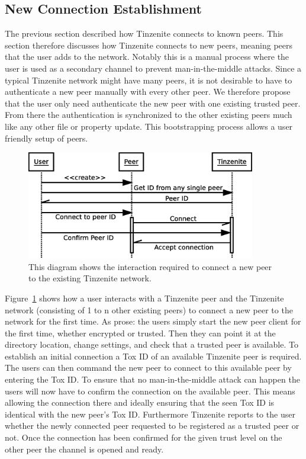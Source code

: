 \subsection{New Connection Establishment}
\label{sub:New Connection Establishment}

The previous section described how Tinzenite connects to known peers.
This section therefore discusses how Tinzenite connects to new peers, meaning peers that the user adds to the network.
Notably this is a manual process where the user is used as a secondary channel to prevent man-in-the-middle attacks.
Since a typical Tinzenite network might have many peers, it is not desirable to have to authenticate a new peer manually with every other peer.
We therefore propose that the user only need authenticate the new peer with one existing trusted peer.
From there the authentication is synchronized to the other existing peers much like any other file or property update.
This bootstrapping process allows a user friendly setup of peers.

\begin{figure}[htp]
\centering
    \includegraphics[width=10cm]{diagram/sequence_new_connect}
\caption[New Connection Sequence Diagram]{This diagram shows the interaction required to connect a new peer to the existing Tinzenite network.}
\label{diagram:new_connection}
\end{figure}

Figure~\ref{diagram:new_connection} shows how a user interacts with a Tinzenite peer and the Tinzenite network (consisting of 1 to n other existing peers) to connect a new peer to the network for the first time.
As prose: the users simply start the new peer client for the first time, whether encrypted or trusted.
Then they can point it at the directory location, change settings, and check that a trusted peer is available.
To establish an initial connection a Tox ID of an available Tinzenite peer is required.
The users can then command the new peer to connect to this available peer by entering the Tox ID.
To ensure that no man-in-the-middle attack can happen the users will now have to confirm the connection on the available peer.
This means allowing the connection there and ideally ensuring that the seen Tox ID is identical with the new peer's Tox ID.
Furthermore Tinzenite reports to the user whether the newly connected peer requested to be registered as a trusted peer or not.
Once the connection has been confirmed for the given trust level on the other peer the channel is opened and ready.


